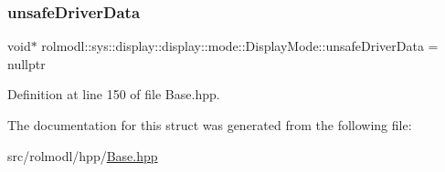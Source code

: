 \mbox{\label{structrolmodl_1_1sys_1_1display_1_1display_1_1mode_1_1_display_mode_a7979bb680b51acbaa5b83dfcb5877110}} 
\subsubsection{\texorpdfstring{unsafeDriverData}{unsafeDriverData}}
{\footnotesize\ttfamily void$\ast$ rolmodl\+::sys\+::display\+::display\+::mode\+::\+Display\+Mode\+::unsafe\+Driver\+Data = nullptr}



Definition at line 150 of file Base.\+hpp.



The documentation for this struct was generated from the following file\+:\begin{DoxyCompactItemize}
\item 
src/rolmodl/hpp/\mbox{\hyperlink{_base_8hpp}{Base.\+hpp}}\end{DoxyCompactItemize}
